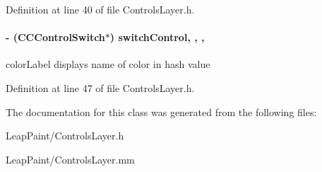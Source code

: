 Definition at line 40 of file Controls\-Layer.\-h.

\hypertarget{interface_controls_layer_a8997cfae8a4f6bcfb8c53d8cab6bb480}{
\paragraph[{switch\-Control}]{\setlength{\rightskip}{0pt plus 5cm}-\/ (C\-C\-Control\-Switch$\ast$) switch\-Control\hspace{0.3cm}{\ttfamily [read]}, {\ttfamily [write]}, {\ttfamily [nonatomic]}, {\ttfamily [strong]}}}\label{d1/d1a/interface_controls_layer_a8997cfae8a4f6bcfb8c53d8cab6bb480}
color\-Label displays name of color in hash value 

Definition at line 47 of file Controls\-Layer.\-h.



The documentation for this class was generated from the following files\-:\begin{DoxyCompactItemize}
\item 
Leap\-Paint/Controls\-Layer.\-h\item 
Leap\-Paint/Controls\-Layer.\-mm\end{DoxyCompactItemize}
